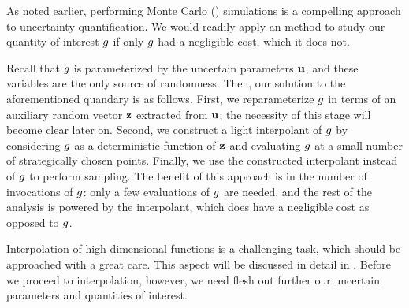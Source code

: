 As noted earlier, performing Monte Carlo () simulations is a compelling
approach to uncertainty quantification. We would readily apply an 
method to study our quantity of interest $g$ if only $g$ had a negligible
cost, which it does not.

Recall that $g$ is parameterized by the uncertain parameters $\mathbf{u}$, and these
variables are the only source of randomness. Then, our solution to the
aforementioned quandary is as follows. First, we reparameterize $g$ in terms of
an auxiliary random vector $\mathbf{z}$ extracted from $\mathbf{u}$; the necessity of this
stage will become clear later on. Second, we construct a light interpolant of
$g$ by considering $g$ as a deterministic function of $\mathbf{z}$ and evaluating
$g$ at a small number of strategically chosen points. Finally, we use the
constructed interpolant instead of $g$ to perform sampling. The benefit of this
approach is in the number of invocations of $g$: only a few evaluations of $g$
are needed, and the rest of the analysis is powered by the interpolant, which
does have a negligible cost as opposed to $g$.

Interpolation of high-dimensional functions is a challenging task, which should
be approached with a great care. This aspect will be discussed in detail in
. Before we proceed to interpolation, however, we need flesh
out further our uncertain parameters and quantities of interest.
